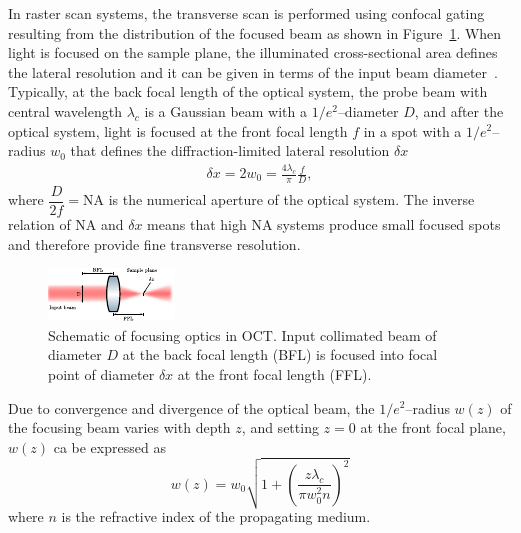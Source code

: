In raster scan systems, the transverse scan is performed using confocal gating resulting from the distribution of the focused beam as shown in Figure~\ref{fig:FocusingLens}. When light is focused on the sample plane, the illuminated cross-sectional area defines the lateral resolution and it can be given in terms of the input beam diameter~\cite{Yasuno2006_Noniterative}. Typically, at the back focal length of the optical system, the probe beam with central wavelength $\lambda_c$ is a Gaussian beam with a $1/e^2$--diameter $D$, and after the optical system, light is focused at the front focal length $f$ in a spot with a $1/e^2$--radius $w_0$ that defines the diffraction-limited lateral resolution $\delta x$~\cite{Fujimoto2015_Introduction}
\begin{align}
    \delta x = 2w_0 = \frac{4\lambda_c}{\pi} \frac{f}{D},
\end{align}
where $\dfrac{D}{2f} = \text{NA}$ is the numerical aperture of the optical system. The inverse relation of NA and $\delta x$ means that high NA systems produce small focused spots and therefore provide fine transverse resolution.

\begin{figure}[htb!]
    \centering
    \includegraphics[width=.6\textwidth]{Figures/TheoreticalBasis/FocusingLens.pdf}
    \caption{Schematic of focusing optics in OCT. Input collimated beam of diameter $D$ at the back focal length (BFL) is focused into focal point of diameter $\delta x$ at the front focal length (FFL).}
    \label{fig:FocusingLens}
\end{figure}

Due to convergence and divergence of the optical beam, the $1/e^2$--radius $w(z)$  of the focusing beam varies with depth $z$, and setting $z=0$ at the front focal plane, $w(z)$ ca be expressed as~\cite{Ralston2005_Deconvolution}
\begin{equation}\label{eq:beamWaist}
    w(z) = w_0 \sqrt{1 + \left(\frac{z\lambda_c}{\pi w_0^2n}\right)^2}
\end{equation}
where $n$ is the refractive index of the propagating medium.

